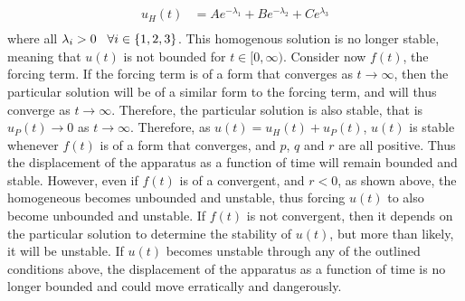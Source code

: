 \documentclass[a4paper]{article}
\newcommand{\ds}{\displaystyle}
\begin{document}
\begin{enumerate}
\begin{align*}
		u_H(t) & = Ae^{-\lambda_1} + Be^{-\lambda_2} + Ce^{\lambda_3}\\
	\end{align*}
	where all $\ds{\lambda_i > 0 \hspace{3mm} \forall i \in \{1,2,3\}}$. This homogenous solution is no longer stable,  meaning that $\ds{u(t)}$ is not bounded for $\ds{t\in [0, \infty)}$. 
	\bigbreak
	Consider now $\ds{f(t)}$, the forcing term. If the forcing term is of a form that converges as $\ds{t\rightarrow \infty}$, then the particular solution will be of a similar form to the forcing term, and will thus converge as $\ds{t\rightarrow \infty}$. Therefore, the particular solution is also stable, that is $\ds{u_P(t) \rightarrow 0}$ as $\ds{t \rightarrow \infty}$. Therefore, as $\ds{u(t) = u_H(t) + u_P(t)}$, $\ds{u(t)}$ is stable whenever $\ds{f(t)}$ is of a form that converges, and $\ds{p}$, $\ds{q}$ and $\ds{r}$ are all positive. Thus the displacement of the apparatus as a function of time will remain bounded and stable.
	\bigbreak
	However, even if $\ds{f(t)}$ is of a convergent, and $\ds{r < 0}$, as shown above, the homogeneous becomes unbounded and unstable, thus forcing $\ds{u(t)}$ to also become unbounded and unstable. If $\ds{f(t)}$ is not convergent, then it depends on the particular solution to determine the stability of $\ds{u(t)}$, but more than likely, it will be unstable.
	\bigbreak
	If $\ds{u(t)}$ becomes unstable through any of the outlined conditions above, the displacement of the apparatus as a function of time is no longer bounded and could move erratically and dangerously.

\end{enumerate}
\end{document}
